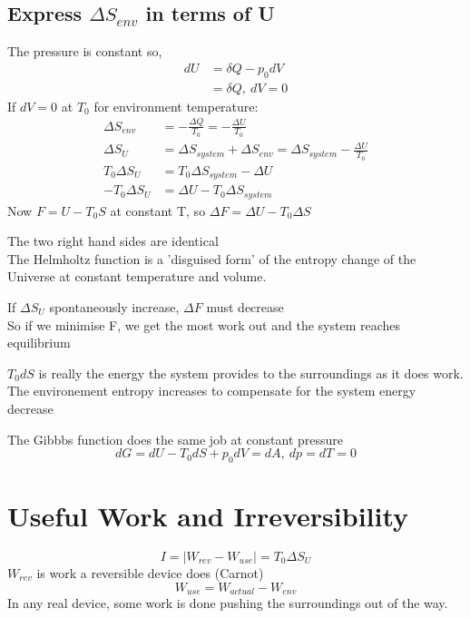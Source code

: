 \documentclass[a4paper, 11pt, normalem]{report}
\begin{document}
\subsection{Express $\Delta S_{env}$ in terms of U}
The pressure is constant so,
\begin{align*}
    dU &= \delta Q - p_0 dV \\
    &= \delta Q,~ dV = 0
\end{align*}
If $dV = 0$ at $T_0$ for environment temperature:
\begin{align*}
    \Delta S_{env} &= -\frac{\Delta Q}{T_0} = -\frac{\Delta U}{T_0} \\
    \Delta S_{U} &= \Delta S_{system} + \Delta S_{env} = \Delta S_{system} - \frac{\Delta U}{T_0} \\
    T_0 \Delta S_U &= T_0\Delta S_{system} - \Delta U \\
    -T_0 \Delta S_U &= \Delta U - T_0\Delta S_{system}
\end{align*}
Now $F = U - T_0 S$ at constant T, so $\Delta F = \Delta U - T_0 \Delta S$

The two right hand sides are identical \\
The Helmholtz function is a 'disguised form' of the entropy change of the Universe at constant temperature and volume.

If $\Delta S_U$ spontaneously increase, $\Delta F$ must decrease \\
So if we minimise F, we get the most work out and the system reaches equilibrium

$T_0 dS$ is really the energy the system provides to the surroundings as it does work.
The environement entropy increases to compensate for the system energy decrease

The Gibbbs function does the same job at constant pressure
\begin{equation*}
    dG = dU - T_0 dS + p_0 dV = dA,~ dp = dT = 0
\end{equation*}

\section{Useful Work and Irreversibility}
\begin{equation*}
    I = |W_{rev} - W_{use}| = T_0 \Delta S_U
\end{equation*}
$W_{rev}$ is work a reversible device does (Carnot)
\begin{equation*}
    W_{use} = W_{actual} - W_{env}
\end{equation*}
In any real device, some work is done pushing the surroundings out of the way.
\end{document}
